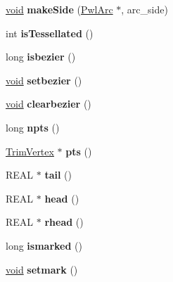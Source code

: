 \begin{DoxyCompactItemize}
\item 
\mbox{\label{class_arc_af3555fcdb983c5b3d4f038448668fdf4}} 
\hyperlink{interfacevoid}{void} {\bfseries make\+Side} (\hyperlink{class_pwl_arc}{Pwl\+Arc} $\ast$, arc\+\_\+side)
\item 
\mbox{\label{class_arc_a2feebfebfed9222b807657cd1d3f0f3f}} 
int {\bfseries is\+Tessellated} ()
\item 
\mbox{\label{class_arc_a6f53fea6a1fb7cb607b50bed7760ce5a}} 
long {\bfseries isbezier} ()
\item 
\mbox{\label{class_arc_ae5d5de4675675c34c953aa40cfcbabef}} 
\hyperlink{interfacevoid}{void} {\bfseries setbezier} ()
\item 
\mbox{\label{class_arc_a38f5bbdb444ab9adf440c11a0a44c246}} 
\hyperlink{interfacevoid}{void} {\bfseries clearbezier} ()
\item 
\mbox{\label{class_arc_aa327b3dccd30331e91ba3bb20eeac14a}} 
long {\bfseries npts} ()
\item 
\mbox{\label{class_arc_a730da8e8f1c2e59cfa22d687ea557f3b}} 
\hyperlink{class_trim_vertex}{Trim\+Vertex} $\ast$ {\bfseries pts} ()
\item 
\mbox{\label{class_arc_ac2da306457f01b3e341b6601641bc6cd}} 
R\+E\+AL $\ast$ {\bfseries tail} ()
\item 
\mbox{\label{class_arc_a4f927d988c4232d50fb434c9993b40bd}} 
R\+E\+AL $\ast$ {\bfseries head} ()
\item 
\mbox{\label{class_arc_aed2e70b80fb5908f88fa233767267c31}} 
R\+E\+AL $\ast$ {\bfseries rhead} ()
\item 
\mbox{\label{class_arc_ae9f63f544c5ad8a8670ad5f1ae086044}} 
long {\bfseries ismarked} ()
\item 
\mbox{\label{class_arc_add868d035592d72e0cf0d938f2b296d7}} 
\hyperlink{interfacevoid}{void} {\bfseries setmark} ()
\item 
\mbox{\label{class_arc_a34662855647d0783c43121123c4f732d}} 

\end{DoxyCompactItemize}
